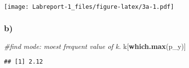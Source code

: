 \documentclass[]{article}
\newenvironment{Shaded}{\begin{snugshade}}{\end{snugshade}}
\newcommand{\CommentTok}[1]{\textcolor[rgb]{0.56,0.35,0.01}{\textit{#1}}}
\newcommand{\KeywordTok}[1]{\textcolor[rgb]{0.13,0.29,0.53}{\textbf{#1}}}
\newcommand{\NormalTok}[1]{#1}
\begin{document}
\texttt{[image: Labreport-1\_files/figure-latex/3a-1.pdf]}

\hypertarget{b-3}{%
\subsubsection{b)}\label{b-3}}

\begin{Shaded}
\begin{Highlighting}[]
\CommentTok{#find mode: moest frequent value of k. }
\NormalTok{k[}\KeywordTok{which.max}\NormalTok{(p_y)]}
\end{Highlighting}
\end{Shaded}

\begin{verbatim}
## [1] 2.12
\end{verbatim}
\end{document}
